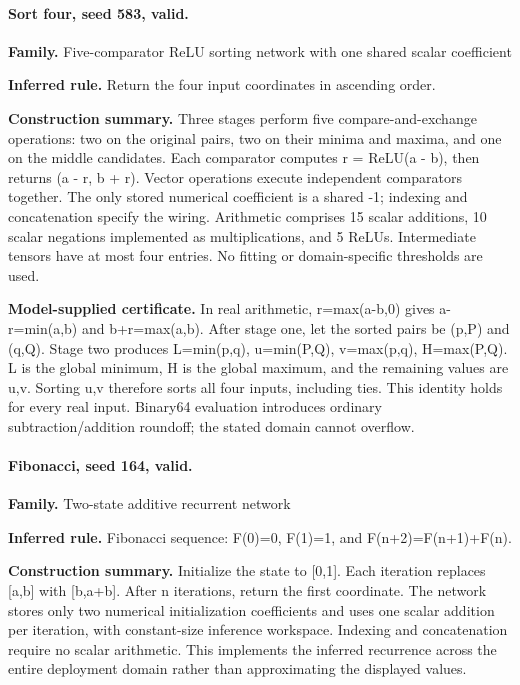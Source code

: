 \paragraph{Sort four, seed 583, valid.}

\textbf{Family.} Five-comparator ReLU sorting network with one shared scalar coefficient


\textbf{Inferred rule.} Return the four input coordinates in ascending order.


\textbf{Construction summary.} Three stages perform five compare-and-exchange operations: two on the original pairs, two on their minima and maxima, and one on the middle candidates. Each comparator computes r = ReLU(a - b), then returns (a - r, b + r). Vector operations execute independent comparators together. The only stored numerical coefficient is a shared -1; indexing and concatenation specify the wiring. Arithmetic comprises 15 scalar additions, 10 scalar negations implemented as multiplications, and 5 ReLUs. Intermediate tensors have at most four entries. No fitting or domain-specific thresholds are used.


\textbf{Model-supplied certificate.} In real arithmetic, r=max(a-b,0) gives a-r=min(a,b) and b+r=max(a,b). After stage one, let the sorted pairs be (p,P) and (q,Q). Stage two produces L=min(p,q), u=min(P,Q), v=max(p,q), H=max(P,Q). L is the global minimum, H is the global maximum, and the remaining values are u,v. Sorting u,v therefore sorts all four inputs, including ties. This identity holds for every real input. Binary64 evaluation introduces ordinary subtraction/addition roundoff; the stated domain cannot overflow.


\paragraph{Fibonacci, seed 164, valid.}

\textbf{Family.} Two-state additive recurrent network


\textbf{Inferred rule.} Fibonacci sequence: F(0)=0, F(1)=1, and F(n+2)=F(n+1)+F(n).


\textbf{Construction summary.} Initialize the state to [0,1]. Each iteration replaces [a,b] with [b,a+b]. After n iterations, return the first coordinate. The network stores only two numerical initialization coefficients and uses one scalar addition per iteration, with constant-size inference workspace. Indexing and concatenation require no scalar arithmetic. This implements the inferred recurrence across the entire deployment domain rather than approximating the displayed values.



